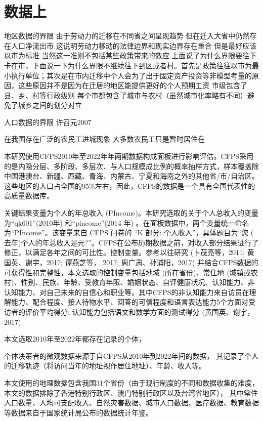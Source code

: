 \documentclass[
  a4paper,
  zihao=-4,
  fontset=mac,
  AutoFakeBold,
  AutoFakeSlant,
  oneside]{ctexbook}
\begin{document}
\section{数据上}

地区数据的界限
由于劳动力的迁移在不同省之间呈现趋势 但在迁入大省中仍然存在人口净流出市 这说明劳动力移动的法律边界和现实边界存在重合 但是最好应该以市为标准 当然这一准则不包括某些政策带来的效应
上面说了为什么界限要往下卡在市，下面说一下为什么界限不继续往下到区或者村。首先是政策往往以市为最小执行单位；其次是在市内迁移中个人会为了出于固定资产投资等非模型考量的原因，这些原因并不是因为在迁居的地区能提供更好的个人预期工资
市级包含了县、乡、村等行政级别 每个市都包含了城市与农村（虽然城市化率略有不同）避免了城乡之间的划分对立


人口数据的界限
许召元2007

在我国存在广泛的农民工进城现象 大多数农民工只是暂时居住在


本研究使用CFPS2010年至2022年年两期数据构成面板进行影响评估。CFPS采用的是内隐分层、多阶段、多层次、与人口规模成比例的概率抽样方式，样本覆盖除中国港澳台、新疆、西藏、青海、内蒙古、宁夏和海南之外的其他省/市/自治区。这些地区的人口占全国的95\%左右，因此，CFPS的数据是一个具有全国代表性的高质量数据库。

关键结果变量为个人的年总收入 (PIncome)。本研究选取的关于个人总收入的变量为“qk601”(2010年) 和“pincome”(2014 年) 。在面板数据中，两个变量统一命名为“PIncome”。该变量来自 CFPS 问卷的 “K 部分: 个人收入”，具体题目为“您 ( 去年)个人的年总收入是元?”。CFPS在公布历期数据之前，对收入部分结果进行了修正，以满足各年之间的可比性。控制变量。参考以往研究 (卜茂亮等，2011; 黄国英、谢宇，2017; 谭燕芝等， 2017; 周广肃、孙浦阳，2017) 并结合CFPS数据的可获得性和完整性，本文选取的控制变量包括地域 (所在省份)、常住地 (城镇或农村)、性别、民族、年龄、受教育年限、婚姻状态、自评健康状况、认知能力、非认知能力、对自己未来的自信心和职业等。其中CFPS的非认知能力来自访员在理解能力、配合程度、接人待物水平、回答的可信程度和语言表达能力5个方面对受访者的评价平均得分; 认知能力包括语文和数学方面的测试得分 (黄国英、谢宇，2017)

本文选取2010年至2022年都存在记录的个体，

个体决策者的微观数据来源于自CFPS从2010年到2022年间的数据，
其记录了个人的迁移轨迹（将访问当年的地址视作居住地址）、年龄、收入等。


本文使用的地理数据包含我国31个省份（由于现行制度的不同和数据收集的难度，本文的数据排除了香港特别行政区、澳门特别行政区以及台湾省地区），
其中常住人口数量、人均可支配收入、自然灾害数据、城市人口数据、医疗数据、教育数据等数据来自于国家统计局公布的数据统计年鉴。
\end{document}
